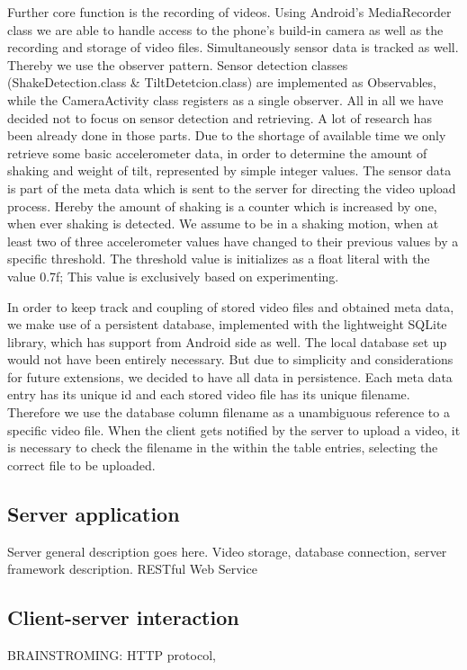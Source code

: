 \documentclass[conference]{IEEEtran}
\begin{document}
Further core function is the recording of videos. Using Android's MediaRecorder class we are able to handle access to the phone's build-in camera as well as the recording and storage of video files.
Simultaneously sensor data is tracked as well. Thereby we use the observer pattern. Sensor detection classes (ShakeDetection.class \& TiltDetetcion.class) are implemented as Observables, while the CameraActivity class registers as a single observer. All in all we have decided not to focus on sensor detection and retrieving. A lot of research has been already done in those parts. Due to the shortage of available time we only retrieve some basic accelerometer data, in order to determine the amount of shaking and weight of tilt, represented by simple integer values. The sensor data is part of the meta data which is sent to the server for directing the video upload process. Hereby the amount of shaking is a counter which is increased by one, when ever shaking is detected. We assume to be in a shaking motion, when at least two of three accelerometer values have changed to their previous values by a specific threshold. The threshold value is initializes as a float literal with the value 0.7f; This value is exclusively based on experimenting.


In order to keep track and coupling of stored video files and obtained meta data, we make use of a persistent database, implemented with the lightweight SQLite library, which has support from Android side as well. The local database set up would not have been entirely necessary. But due to simplicity and considerations for future extensions, we decided to have all data in persistence.
Each meta data entry has its unique id and each stored video file has its unique filename. Therefore we use the database column filename as a unambiguous reference to a specific video file. When the client gets notified by the server to upload a video, it is necessary to check the filename in the within the table entries, selecting the correct file to be uploaded.



\subsection{Server application}
Server general description goes here.
Video storage, database connection, server framework description. RESTful Web Service

\subsection{Client-server interaction}
BRAINSTROMING: HTTP protocol, 
\end{document}
